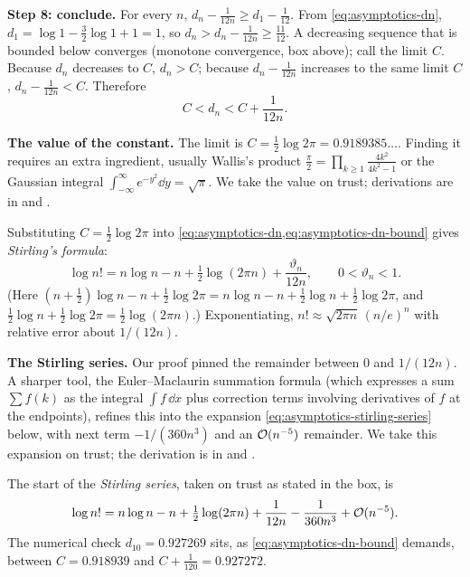 \textbf{Step 8: conclude.} For every $n$, $d_n-\tfrac1{12n}\ge d_1-\tfrac1{12}$. From \cref{eq:asymptotics-dn}, $d_1=\log1-\tfrac32\log1+1=1$, so $d_n>d_n-\tfrac{1}{12n}\ge\tfrac{11}{12}$. A decreasing sequence that is bounded below converges (monotone convergence, box above); call the limit $C$. Because $d_n$ decreases to $C$, $d_n>C$; because $d_n-\tfrac1{12n}$ increases to the same limit $C$, $d_n-\tfrac1{12n}<C$. Therefore
\begin{equation}
C<d_n<C+\frac{1}{12n}.
\label{eq:asymptotics-dn-bound}
\end{equation}

\begin{beyond}
\textbf{The value of the constant.} The limit is $C=\tfrac12\log2\pi=0.9189385\ldots$. Finding it requires an extra ingredient, usually Wallis's product $\frac{\pi}{2}=\prod_{k\ge1}\frac{4k^2}{4k^2-1}$ or the Gaussian integral $\int_{-\infty}^{\infty}e^{-y^2}\dd y=\sqrt\pi$. We take the value on trust; derivations are in \cite{rhb} and \cite{apostol}.
\end{beyond}

Substituting $C=\tfrac12\log2\pi$ into \cref{eq:asymptotics-dn,eq:asymptotics-dn-bound} gives \emph{Stirling's formula}:
\begin{equation}
\log n!=n\log n-n+\tfrac12\log(2\pi n)+\frac{\vartheta_n}{12n},\qquad 0<\vartheta_n<1 .
\label{eq:asymptotics-stirling}
\end{equation}
(Here $(n+\tfrac12)\log n-n+\tfrac12\log2\pi=n\log n-n+\tfrac12\log n+\tfrac12\log2\pi$, and $\tfrac12\log n+\tfrac12\log2\pi=\tfrac12\log(2\pi n)$.) Exponentiating, $n!\approx\sqrt{2\pi n}\,(n/e)^n$ with relative error about $1/(12n)$. 
\begin{beyond}
\textbf{The Stirling series.} Our proof pinned the remainder between $0$ and $1/(12n)$. A sharper tool, the Euler--Maclaurin summation formula (which expresses a sum $\sum f(k)$ as the integral $\int f\,\dd x$ plus correction terms involving derivatives of $f$ at the endpoints), refines this into the expansion \cref{eq:asymptotics-stirling-series} below, with next term $-1/(360n^3)$ and an $\mathcal{O}(n^{-5})$ remainder. We take this expansion on trust; the derivation is in \cite{rhb} and \cite{apostol}.
\end{beyond}
\noindent The start of the \emph{Stirling series}, taken on trust as stated in the box, is
\begin{equation}
\log n!=n\log n-n+\tfrac12\log(2\pi n)+\frac{1}{12n}-\frac{1}{360n^3}+\mathcal{O}(n^{-5}).
\label{eq:asymptotics-stirling-series}
\end{equation}
The numerical check $d_{10}=0.927269$ sits, as \cref{eq:asymptotics-dn-bound} demands, between $C=0.918939$ and $C+\tfrac{1}{120}=0.927272$.

